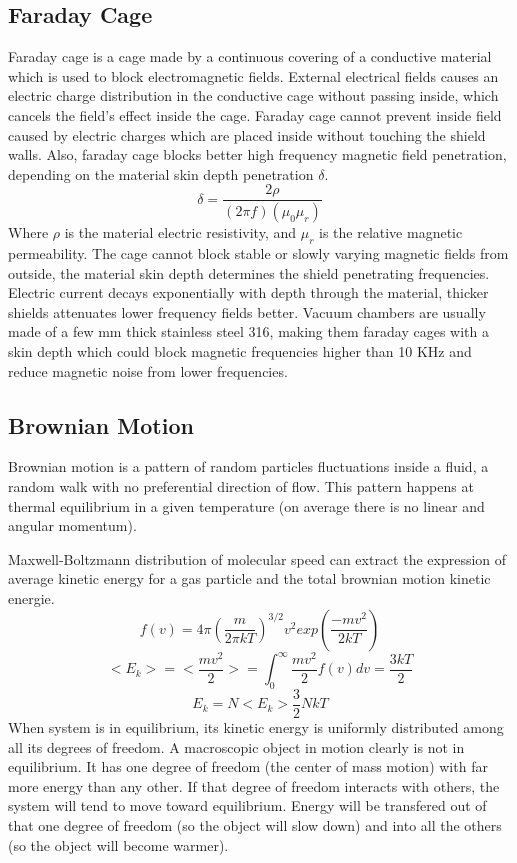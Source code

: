 \documentclass[\main/master.tex]{subfiles}
\begin{document}
\subsection{Faraday Cage}
Faraday cage is a cage made by a continuous covering of a conductive material which is used to block electromagnetic fields. External electrical fields causes an electric charge distribution in the conductive cage without passing inside, which cancels the field's effect inside the cage. Faraday cage cannot prevent inside field caused by electric charges which are placed inside without touching the shield walls. Also, faraday cage blocks better high frequency magnetic field penetration, depending on the material skin depth penetration $\delta$.
\begin{equation}
\delta = \frac{2\rho}{(2\pi f)(\mu_0\mu_r)}     \label{eqn:mean-free-pass}
\end{equation}
Where $\rho$ is the material electric resistivity, and $\mu_r$ is the relative magnetic permeability. The cage cannot block stable or slowly varying magnetic fields from outside, the material skin depth determines the shield penetrating frequencies. Electric current decays exponentially with depth through the material, thicker shields attenuates lower frequency fields better. Vacuum chambers are usually made of a few mm thick stainless steel 316, making them faraday cages with a skin depth which could block magnetic frequencies higher than 10 KHz and reduce magnetic noise from lower frequencies.

\subsection{Brownian Motion}
Brownian motion is a pattern of random particles fluctuations inside a fluid, a random walk with no preferential direction of flow. This pattern happens at thermal equilibrium in a given temperature (on average there is no linear and angular momentum). 
\par
Maxwell-Boltzmann distribution of molecular speed can extract the expression of average kinetic energy for a gas particle and the total brownian motion kinetic energie.
\begin{equation}
f(v) = 4\pi(\frac{m}{2\pi kT})^{3/2}v^2exp(\frac{-mv^2}{2kT})     \label{eqn:Maxwell_Boltzmann}
\end{equation}  
\begin{equation}
<E_k>=<\frac{mv^2}{2}> = \int_{0}^{\infty}\frac{mv^2}{2}f(v)dv =  \frac{3kT}{2}    \label{eqn:avrage_kinetic}
\end{equation}
\begin{equation}
E_k=N<E_k> \frac{3}{2}NkT    \label{eqn:total_kinetic}
\end{equation}
When system is in equilibrium, its kinetic energy is uniformly distributed among all its degrees of freedom. A macroscopic object in motion clearly is not in equilibrium. It has one degree of freedom (the center of mass motion) with far more energy than any other. If that degree of freedom interacts with others, the system will tend to move toward equilibrium. Energy will be transfered out of that one degree of freedom (so the object will slow down) and into all the others (so the object will become warmer).
\end{document}
